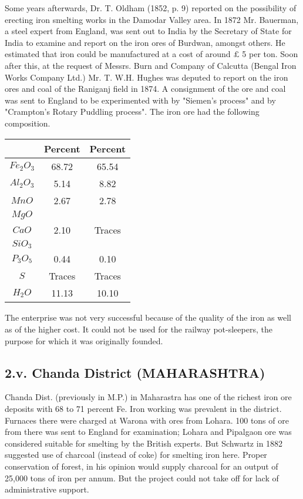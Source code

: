 Some years afterwards, Dr. T. Oldham (1852, p. 9) reported on the possibility of erecting iron smelting works in the Damodar Valley area. In 1872 Mr. Bauerman, a steel expert from England, was sent out to India by the Secretary of State for India to examine and report on the iron ores of Burdwan, amongst others. He estimated that iron could be manufactured at a cost of around $£$ 5 per ton.  Soon after this, at the request of Messrs. Burn and Company of Calcutta (Bengal Iron Works Company Ltd.) Mr. T. W.H. Hughes was deputed to report on the iron ores and coal of the Raniganj field in 1874.  A consignment of the ore and coal was sent to England to be experimented with by "Siemen's process" and by "Crampton's Rotary Puddling process".  The iron ore had the following composition.
{\fontsize{8}{10}\selectfont
\begin{center}
\begin{tabular}{|c|c|c|}
\hline
 & Percent & Percent\\\hline
$Fe_2O_3$ & 68.72 & 65.54\\ \hline
$Al_2O_3$ & 5.14 & 8.82\\ \hline
$MnO$ & 2.67 & 2.78\\ \hline
$MgO$ & & \\
$CaO$ & 2.10 & Traces\\ 
$SiO_3$ & & \\ \hline
$P_3O_5$ & 0.44 & 0.10\\ \hline
$S$ & Traces & Traces \\ \hline
$H_2O$ & 11.13 & 10.10\\ \hline
\end{tabular}
\end{center}
}

The enterprise was not very successful because of the quality of the iron as well as of the higher cost.  It could not be used for the railway pot-sleepers, the purpose for which it was originally founded.

\subsection*{2.v. Chanda District (MAHARASHTRA)}

Chanda Dist. (previously in M.P.) in Maharastra has one of the richest iron ore deposits with 68 to 71 percent Fe. Iron working was prevalent in the district. Furnaces there were charged at Warona with ores from Lohara.  100 tons of ore from there was sent to England for examination; Lohara and Pipalgaon ore was considered suitable for smelting by the British experts.  But Schwartz in 1882 suggested use of charcoal (instead of coke) for smelting iron here.  Proper conservation of forest, in his opinion would supply charcoal for an output of 25,000 tons of iron per annum.  But the project could not take off for lack of administrative support.

